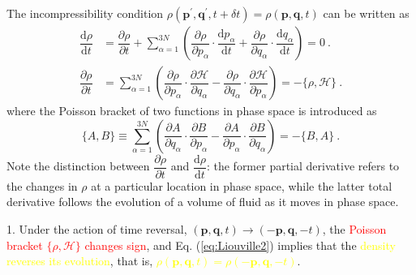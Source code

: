 \documentclass[12pt,a4paper]{article}
\renewcommand{\vec}[1]{\boldsymbol{#1}}
\newcommand{\dif}{\mathrm{d}}
\begin{document}
The incompressibility condition $\rho(\vec{p}^\prime, \vec{q}^\prime, t +\delta t) = \rho(\vec{p}, \vec{q}, t)$ can be written as
\begin{align}
\dfrac{\dif \rho}{\dif t} &= \dfrac{\partial \rho}{\partial t} +\sum_{\alpha=1}^{3N} \left(\dfrac{\partial \rho}{\partial p_\alpha}\cdot \dfrac{\dif p_\alpha}{\dif t} +\dfrac{\partial \rho}{\partial q_\alpha}\cdot \dfrac{\dif q_\alpha}{\dif t}  \right) = 0 ~. \\
\dfrac{\partial \rho}{\partial t} &= \sum_{\alpha=1}^{3N} \left(\dfrac{\partial \rho}{\partial p_\alpha}\cdot \dfrac{\partial \mathcal H}{\partial q_\alpha} -\dfrac{\partial \rho}{\partial q_\alpha}\cdot \dfrac{\partial \mathcal H}{\partial p_\alpha}  \right) = -\{\rho, \mathcal H \} ~.
\label{eq:Liouville2}
\end{align}
where the Poisson bracket of two functions in phase space is introduced as
\begin{equation}
\{A, B \} \equiv \sum_{\alpha=1}^{3N} \left(\dfrac{\partial A}{\partial q_\alpha}\cdot \dfrac{\partial B}{\partial p_\alpha} -\dfrac{\partial A}{\partial p_\alpha}\cdot \dfrac{\partial B}{\partial q_\alpha}  \right) = -\{B, A \} ~.
\end{equation}
Note the distinction between $\dfrac{\partial \rho}{\partial t}$ and $\dfrac{\dif \rho}{\dif t}$: the former partial derivative refers to the changes in $\rho$ at a particular location in phase space, while the latter total derivative follows the evolution of a volume of fluid as it moves in phase space. 


1. Under the action of time reversal, $(\vec{p}, \vec{q}, t) \rightarrow (-\vec{p}, \vec{q}, -t)$, the \textcolor{red}{Poisson bracket $\{\rho, \mathcal H \}$ changes sign}, and Eq. (\ref{eq:Liouville2}) implies that the \textcolor{yellow}{density reverses its evolution}, that is, \textcolor{yellow}{$\rho(\vec{p}, \vec{q}, t) = \rho(-\vec{p}, \vec{q}, -t)$}. 
\end{document}
